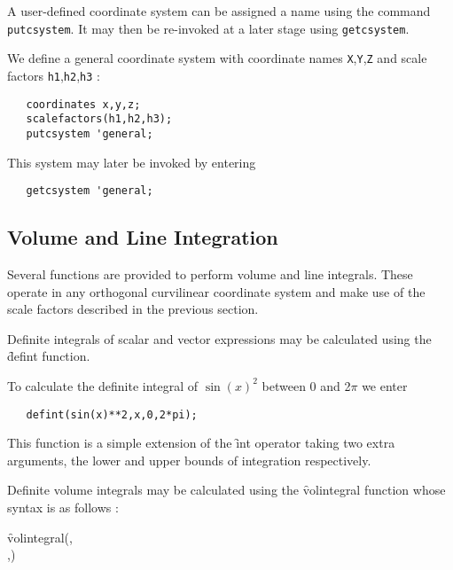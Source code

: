 A user-defined coordinate system can be assigned a name using the
command \texttt{putcsystem}. It may then be re-invoked at a later stage using
\texttt{getcsystem}.

\example{}

We define a general coordinate system with coordinate names \texttt{X},\texttt{Y},\texttt{Z}
and scale factors \texttt{h1},\texttt{h2},\texttt{h3} :
\begin{verbatim}
   coordinates x,y,z;
   scalefactors(h1,h2,h3);
   putcsystem 'general;
\end{verbatim}
This system may later be invoked by entering
\begin{verbatim}
   getcsystem 'general;
\end{verbatim}

\subsection{Volume and Line Integration}

Several functions are provided to perform volume and line integrals.
These operate in any orthogonal curvilinear coordinate system and
make use of the scale factors described in the previous section.


Definite integrals of scalar and vector expressions may be calculated
using the \f{defint} function.

\example{}

 
\hypertarget{operator:DEFINT}{}
\noindent To calculate the definite integral of $\sin(x)^2$ between 0 and
2$\pi$ we enter
\begin{verbatim}
   defint(sin(x)**2,x,0,2*pi);
\end{verbatim}
This function is a simple extension of the \f{int} operator taking
two extra arguments, the lower and upper bounds of integration
respectively.

 
\hypertarget{operator:VOLINTEGRAL}{}
Definite volume integrals may be calculated using the \f{volintegral}
function whose syntax is as follows :
\begin{syntax}
  \f{volintegral}(,\\
  ,)
\end{syntax}

